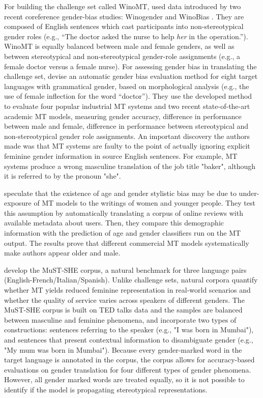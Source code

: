 For building the challenge set called WinoMT, \citet{Stanovsky_2019} used data introduced by two recent coreference gender-bias studies: Winogender \parencite{Rudinger_2018_coreference} and WinoBias \parencite{Zhao_2018_coreference}. They are composed of English sentences which cast participants into non-stereotypical gender roles (e.g., “The doctor asked the nurse to help \textit{her} in the operation.”). WinoMT is equally balanced between male and female genders, as well as between stereotypical and non-stereotypical gender-role assignments (e.g., a female doctor versus a female nurse). 
For assessing gender bias in translating the challenge set, \citet{Stanovsky_2019} devise an automatic gender bias evaluation method for eight target languages with grammatical gender, based on morphological analysis (e.g., the use of female inflection for the word “doctor”). They use the developed method to evaluate four popular industrial MT systems and two recent state-of-the-art academic MT models, measuring gender accuracy, difference in performance between male and female, difference in performance between stereotypical and non-stereotypical gender role assignments. An important discovery the authors made was that MT systems are faulty to the point of actually ignoring explicit feminine gender information in source English sentences. For example, MT systems produce a wrong masculine translation of the job title "baker", although it is referred to by the pronoun "she".

\citet{Hovy_2020} speculate that the existence of age and gender stylistic bias may be due to under-exposure of MT models to the writings of women and younger people. They test this assumption by automatically translating a corpus of online reviews with available metadata about users. Then, they compare this demographic information with the prediction of age and gender classifiers run on the MT output. The results prove that different commercial MT models systematically make authors appear older and male.

\citet{MuST-SHE} develop the MuST-SHE corpus, a natural benchmark for three language pairs (English-French/Italian/Spanish). Unlike challenge sets, natural corpora quantify whether MT yields reduced feminine representation in real-world scenarios and whether the quality of service varies across speakers of different genders. The MuST-SHE corpus is built on  TED talks data and the samples are balanced between masculine and feminine phenomena, and incorporate two types of constructions: sentences referring to the speaker (e.g., "I was born in Mumbai"), and sentences that present contextual information to disambiguate gender (e.g., "My mum was born in Mumbai"). Because every gender-marked word in the target language is annotated in the corpus, the corpus allows for accuracy-based evaluations on gender translation for four different types of gender phenomena. However, all gender marked words are treated equally, so it is not possible to identify if the model is propagating stereotypical representations.

